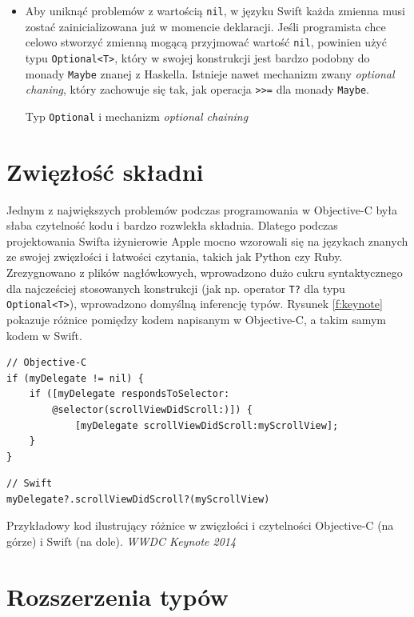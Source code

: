\documentclass[mgr, shortabstract]{iithesis}
\newcommand{\swiftlisting}[2]{
    \swiftcode{src/#1.swift}
    \begin{listing}[ht]
      \caption{#2}
      \label{l:#1}
    \end{listing}
}
\begin{document}
\begin{itemize}
    \item Aby uniknąć problemów z wartością \texttt{nil}, w języku Swift każda zmienna musi zostać zainicializowana już w momencie deklaracji. Jeśli programista chce celowo stworzyć zmienną mogącą przyjmować wartość \texttt{nil}, powinien użyć typu \texttt{Optional<T>}, który w swojej konstrukcji jest bardzo podobny do monady \texttt{Maybe} znanej z Haskella. Istnieje nawet mechanizm zwany \textit{optional chaning}, który zachowuje się tak, jak operacja \texttt{>>=} dla monady \texttt{Maybe}.

    \swiftlisting
        {2_optional}
        {Typ \texttt{Optional} i mechanizm \textit{optional chaining}}

\end{itemize}

\section{Zwięzłość składni}
\label{s:zwiezlosc_skladni}

Jednym z największych problemów podczas programowania w Objective-C była słaba czytelność kodu i bardzo rozwlekła składnia. Dlatego podczas projektowania Swifta iżynierowie Apple mocno wzorowali się na językach znanych ze swojej zwięzłości i łatwości czytania, takich jak Python czy Ruby. Zrezygnowano z plików nagłówkowych, wprowadzono dużo cukru syntaktycznego dla najcześciej stosowanych konstrukcji (jak np. operator \texttt{T?} dla typu \texttt{Optional<T>}), wprowadzono domyślną inferencję typów. Rysunek \ref{f:keynote} pokazuje różnice pomiędzy kodem napisanym w Objective-C, a takim samym kodem w Swift.

\begin{listing}[ht]
\begin{verbatim}
// Objective-C
if (myDelegate != nil) {
    if ([myDelegate respondsToSelector:
        @selector(scrollViewDidScroll:)]) {
            [myDelegate scrollViewDidScroll:myScrollView];
    }
}
\end{verbatim}

\begin{verbatim}
// Swift
myDelegate?.scrollViewDidScroll?(myScrollView)
\end{verbatim}
\caption{Przykładowy kod ilustrujący różnice w zwięzłości i czytelności Objective-C (na górze) i Swift (na dole). \textit{WWDC Keynote 2014}}
\label{f:keynote}
\end{listing}

\section{Rozszerzenia typów}
\label{s:rozszerzenia_typow}
\end{document}
